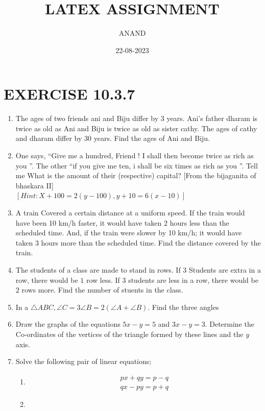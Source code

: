 \documentclass{article}
\theoremstyle{remark}
\begin{document}
\title{LATEX ASSIGNMENT}
\author{ANAND}
\date{22-08-2023}
\maketitle
\section*{EXERCISE 10.3.7}
\begin{enumerate}
\item The ages of two friends ani and Biju differ  by $3$  years. Ani's father dharam is twice as old as Ani and Biju is twice as old as sister cathy. The ages of cathy and dharam differ by $30$ years. Find the ages of Ani and Biju.
\item  One says, \textquotedblleft Give me a hundred, Friend !  I shall then become twice as rich as you \textquotedblright. The other \textquotedblleft  if you give me ten, i shall be six times as rich as you \textquotedblright.  Tell me What is the amount of their (respective) capital? [From the bijaganita of bhaskara II] 
\\ $[Hint: X+100=2(y-100), y+10=6(x-10)]$
\item A train Covered a certain distance at a uniform speed. If the train would have been 10 km/h faster, it would have taken $2$ hours less than the scheduled time. And, if the train were slower by 10 km/h; it would have taken $3$ hours more than the scheduled time. Find the distance covered by the train.
\item The students of a class are made to stand in rows. If 3 Students are extra in a row, there would be $1$ row less. If $3$ students are less in a row, there would be $2$ rows more. Find the number of stuents in the class.
\item In a $\triangle ABC, \angle C=3 \angle B=2(\angle A+\angle B)$. Find the three angles
\item Draw the graphs of the equations $5x-y=5$ and $3x-y=3$. Determine the Co-ordinates of the vertices of the triangle formed by these lines and the $y$ axis.
\item Solve the following pair of linear equations;
\begin{enumerate}
\item
\begin{align}
px+qy=p-q\\ qx-py=p+q
\end{align}
\item
\begin{align}                                                   

\end{align}
\end{enumerate}
\end{enumerate}
\end{document}
